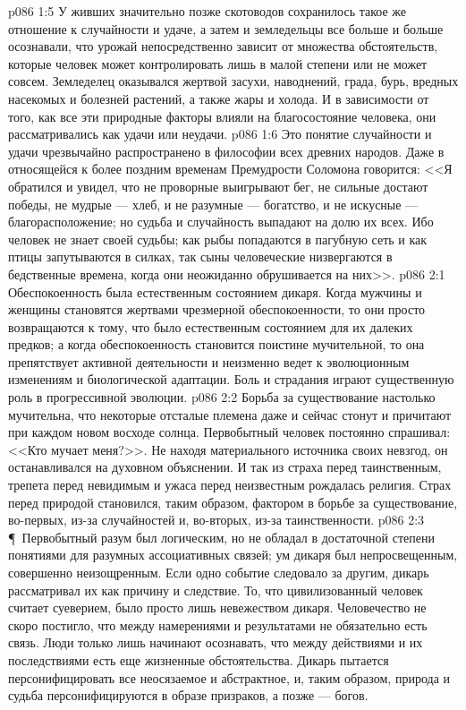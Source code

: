 \vs p086 1:5 У живших значительно позже скотоводов сохранилось такое же отношение к случайности и удаче, а затем и земледельцы все больше и больше осознавали, что урожай непосредственно зависит от множества обстоятельств, которые человек может контролировать лишь в малой степени или не может совсем. Земледелец оказывался жертвой засухи, наводнений, града, бурь, вредных насекомых и болезней растений, а также жары и холода. И в зависимости от того, как все эти природные факторы влияли на благосостояние человека, они рассматривались как удачи или неудачи.
\vs p086 1:6 Это понятие случайности и удачи чрезвычайно распространено в философии всех древних народов. Даже в относящейся к более поздним временам Премудрости Соломона говорится: <<Я обратился и увидел, что не проворные выигрывают бег, не сильные достают победы, не мудрые --- хлеб, и не разумные --- богатство, и не искусные --- благорасположение; но судьба и случайность выпадают на долю их всех. Ибо человек не знает своей судьбы; как рыбы попадаются в пагубную сеть и как птицы запутываются в силках, так сыны человеческие низвергаются в бедственные времена, когда они неожиданно обрушивается на них>>.
\vs p086 2:1 Обеспокоенность была естественным состоянием дикаря. Когда мужчины и женщины становятся жертвами чрезмерной обеспокоенности, то они просто возвращаются к тому, что было естественным состоянием для их далеких предков; а когда обеспокоенность становится поистине мучительной, то она препятствует активной деятельности и неизменно ведет к эволюционным изменениям и биологической адаптации. Боль и страдания играют существенную роль в прогрессивной эволюции.
\vs p086 2:2 Борьба за существование настолько мучительна, что некоторые отсталые племена даже и сейчас стонут и причитают при каждом новом восходе солнца. Первобытный человек постоянно спрашивал: <<Кто мучает меня?>>. Не находя материального источника своих невзгод, он останавливался на духовном объяснении. И так из страха перед таинственным, трепета перед невидимым и ужаса перед неизвестным рождалась религия. Страх перед природой становился, таким образом, фактором в борьбе за существование, во\hyp{}первых, из\hyp{}за случайностей и, во\hyp{}вторых, из\hyp{}за таинственности.
\vs p086 2:3 \P\ Первобытный разум был логическим, но не обладал в достаточной степени понятиями для разумных ассоциативных связей; ум дикаря был непросвещенным, совершенно неизощренным. Если одно событие следовало за другим, дикарь рассматривал их как причину и следствие. То, что цивилизованный человек считает суеверием, было просто лишь невежеством дикаря. Человечество не скоро постигло, что между намерениями и результатами не обязательно есть связь. Люди только лишь начинают осознавать, что между действиями и их последствиями есть еще жизненные обстоятельства. Дикарь пытается персонифицировать все неосязаемое и абстрактное, и, таким образом, природа и судьба персонифицируются в образе призраков, а позже --- богов.
